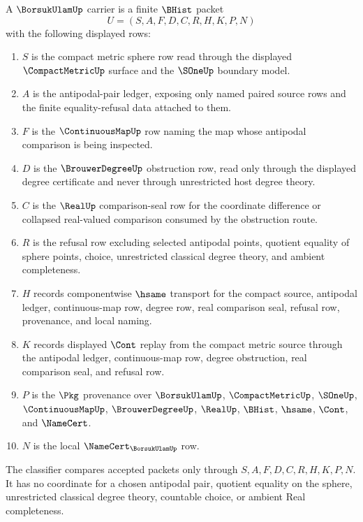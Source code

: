 \begin{definition}
\label{def:borsuk-ulam-carrier}
A $\BorsukUlamUp$ carrier is a finite $\BHist$ packet
$$
U=(S,A,F,D,C,R,H,K,P,N)
$$
with the following displayed rows:
\begin{enumerate}
\item $S$ is the compact metric sphere row read through the displayed $\CompactMetricUp$ surface and the $\SOneUp$ boundary model.
\item $A$ is the antipodal-pair ledger, exposing only named paired source rows and the finite equality-refusal data attached to them.
\item $F$ is the $\ContinuousMapUp$ row naming the map whose antipodal comparison is being inspected.
\item $D$ is the $\BrouwerDegreeUp$ obstruction row, read only through the displayed degree certificate and never through unrestricted host degree theory.
\item $C$ is the $\RealUp$ comparison-seal row for the coordinate difference or collapsed real-valued comparison consumed by the obstruction route.
\item $R$ is the refusal row excluding selected antipodal points, quotient equality of sphere points, choice, unrestricted classical degree theory, and ambient completeness.
\item $H$ records componentwise $\hsame$ transport for the compact source, antipodal ledger, continuous-map row, degree row, real comparison seal, refusal row, provenance, and local naming.
\item $K$ records displayed $\Cont$ replay from the compact metric source through the antipodal ledger, continuous-map row, degree obstruction, real comparison seal, and refusal row.
\item $P$ is the $\Pkg$ provenance over $\BorsukUlamUp$, $\CompactMetricUp$, $\SOneUp$, $\ContinuousMapUp$, $\BrouwerDegreeUp$, $\RealUp$, $\BHist$, $\hsame$, $\Cont$, and $\NameCert$.
\item $N$ is the local $\NameCert_{\BorsukUlamUp}$ row.
\end{enumerate}
The classifier compares accepted packets only through $S,A,F,D,C,R,H,K,P,N$. It has no coordinate for a chosen antipodal pair, quotient equality on the sphere, unrestricted classical degree theory, countable choice, or ambient Real completeness.
\end{definition}

